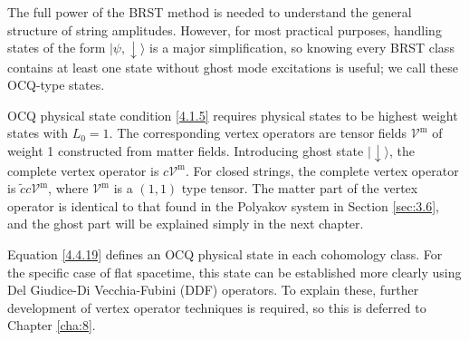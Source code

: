 The full power of the BRST method is needed to understand the general structure of string amplitudes. However, for most practical purposes, handling states of the form $|\psi,\downarrow\rangle$ is a major simplification, so knowing every BRST class contains at least one state without ghost mode excitations is useful; we call these OCQ-type states.

OCQ physical state condition \eqref{4.1.5} requires physical states to be highest weight states with $L_{0}=1$. The corresponding vertex operators are tensor fields $\mathscr{V}^{\mathrm{m}}$ of weight 1 constructed from matter fields. Introducing ghost state $\lvert\downarrow\rangle$, the complete vertex operator is $c \mathscr{V}^{\mathrm{m}}$. For closed strings, the complete vertex operator is $\tilde{c} c \mathscr{V}^{\mathrm{m}}$, where $\mathscr{V}^{\mathrm{m}}$ is a $(1,1)$ type tensor. The matter part of the vertex operator is identical to that found in the Polyakov system in Section \ref{sec:3.6}, and the ghost part will be explained simply in the next chapter.

Equation \eqref{4.4.19} defines an OCQ physical state in each cohomology class. For the specific case of flat spacetime, this state can be established more clearly using Del Giudice-Di Vecchia-Fubini (DDF) operators. To explain these, further development of vertex operator techniques is required, so this is deferred to Chapter \ref{cha:8}.